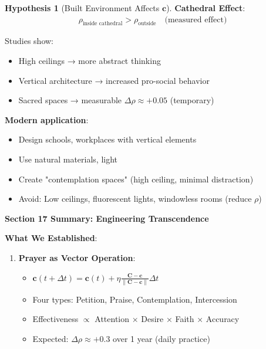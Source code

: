 \documentclass[11pt,a4paper]{article}
\theoremstyle{definition}
\newtheorem{hypothesis}{Hypothesis}[section]
\theoremstyle{remark}
\newcommand{\cc}{\mathbf{c}}
\begin{document}
\begin{enumerate}
\begin{protocol}
\begin{hypothesis}[Built Environment Affects \(\cc\)]
\textbf{Cathedral Effect}:
\begin{align}
\rho_{\text{inside cathedral}} > \rho_{\text{outside}} \quad \text{(measured effect)}
\end{align}

Studies show:
\begin{itemize}
    \item High ceilings → more abstract thinking
    \item Vertical architecture → increased pro-social behavior
    \item Sacred spaces → measurable \(\Delta\rho \approx +0.05\) (temporary)
\end{itemize}

\textbf{Modern application}:
\begin{itemize}
    \item Design schools, workplaces with vertical elements
    \item Use natural materials, light
    \item Create "contemplation spaces" (high ceiling, minimal distraction)
    \item Avoid: Low ceilings, fluorescent lights, windowless rooms (reduce \(\rho\))
\end{itemize}
\end{hypothesis}

\begin{mdframed}[backgroundcolor=green!10,linewidth=2pt,linecolor=green!70!black]
\textbf{Section 17 Summary: Engineering Transcendence}

\textbf{What We Established}:
\begin{enumerate}[nosep]
    \item \textbf{Prayer as Vector Operation}:
        \begin{itemize}[nosep]
            \item \(\cc(t + \Delta t) = \cc(t) + \eta \frac{\mathbf{C} - \cc}{\|\mathbf{C} - \cc\|} \Delta t\)
            \item Four types: Petition, Praise, Contemplation, Intercession
            \item Effectiveness \(\propto\) Attention × Desire × Faith × Accuracy
            \item Expected: \(\Delta\rho \approx +0.3\) over 1 year (daily practice)
        \end{itemize}
    

\end{enumerate}
\end{mdframed}
\end{protocol}
\end{enumerate}
\end{document}
